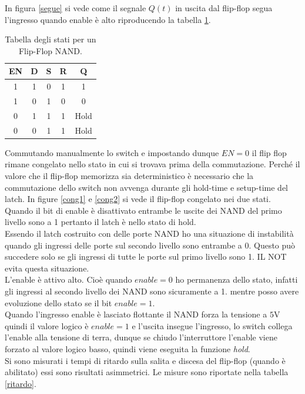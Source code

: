 \documentclass[10pt,a4paper]{article}
\begin{document}
In figura \ref{segue} si vede come il segnale $Q(t)$ in uscita dal flip-flop segua l'ingresso quando enable è alto riproducendo la tabella \ref{stati2}.\\

\begin{table}[!htb]
\centering
\begin{tabular}{|c|c|c|c|c|}
\hline 
EN & D & S & R & Q\\ 
\hline 
1 & 1 & 0 & 1 & 1\\ 
\hline 
1 & 0 & 1 & 0 & 0\\ 
\hline 
0 & 1 & 1 & 1 & Hold\\ 
\hline 
0 & 0 & 1 & 1 & Hold\\ 
\hline 
\end{tabular}
\caption{Tabella degli stati per un Flip-Flop NAND. \label{stati2}}
\end{table}


Commutando manualmente lo switch e impostando dunque $EN = 0$ il flip flop rimane congelato nello stato in cui si trovava prima della commutazione.
Perché il valore che il flip-flop memorizza sia deterministico è necessario che la commutazione dello switch non avvenga durante gli hold-time e setup-time del latch. In figure \ref{cong1} e \ref{cong2} si vede il flip-flop congelato nei due stati. Quando il bit di enable è disattivato entrambe le uscite dei NAND del primo livello sono a 1 pertanto il latch è nello stato di hold.\\

Essendo il latch costruito con delle porte NAND ho una situazione di instabilità quando gli ingressi delle porte sul secondo livello sono entrambe a 0. Questo può succedere solo se gli ingressi di tutte le porte sul primo livello sono 1. IL NOT evita questa situazione.\\
L'enable è attivo alto. Cioè quando $enable = 0$ ho permanenza dello stato, infatti gli ingressi al secondo livello dei NAND sono sicuramente a 1. mentre posso avere evoluzione dello stato se il bit $enable = 1$.\\
Quando l'ingresso enable è lasciato flottante il NAND forza la tensione a $5$V quindi il valore logico è   $enable = 1$ e l'uscita insegue l'ingresso, lo switch collega l'enable alla tensione di terra, dunque se chiudo l'interruttore l'enable viene forzato al valore logico basso, quindi viene eseguita la funzione \emph{hold}.\\

Si sono misurati i tempi di ritardo sulla salita e discesa del flip-flop (quando è abilitato) essi sono risultati asimmetrici. Le misure sono riportate nella tabella \ref{ritardo}.
\end{document}
